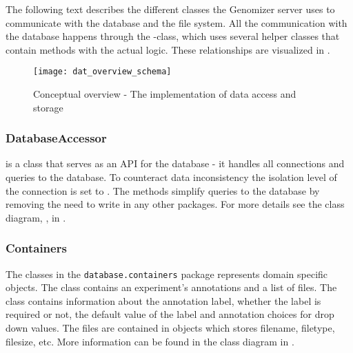 The following text describes the different classes the Genomizer server uses to communicate with the database and the file system. All the communication with the database happens through the -class, which uses several helper classes that contain methods with the actual logic. These relationships are visualized in . 

\begin{figure}[h!]
	\centering
	\texttt{[image: dat\_overview\_schema]}
\caption{Conceptual overview - The implementation of data access and storage}
\label{fig:dat_overview_schema}
\end{figure}

\subsubsection{DatabaseAccessor}
 is a class that serves as an API for the  database - it handles all connections and queries to the database. To counteract data inconsistency the isolation level of the connection is set to . The methods simplify queries to the database by removing the need to write  in any other packages. For more details see the class diagram, , in .

\subsubsection{Containers}
The classes in the \texttt{database.containers} package represents domain specific objects. The  class contains an experiment's annotations and a list of files. The  class contains information about the annotation label, whether the label is required or not, the default value of the label and annotation choices for drop down values. The files are contained in  objects which stores filename, filetype, filesize, etc. More information can be found in the class diagram  in .

